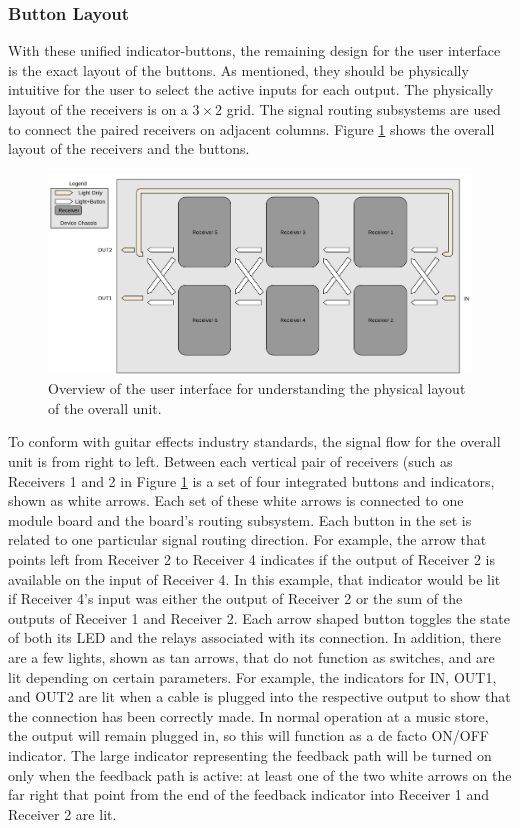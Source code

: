 \documentclass{article}
\begin{document}
	\subsubsection{Button Layout}

	With these unified indicator-buttons, the remaining design for the user interface is the exact layout of the buttons.  As mentioned, they should be physically intuitive for the user to select the active inputs for each output.  The physically layout of the receivers is on a $3 \times 2$ grid.  The signal routing subsystems are used to connect the paired receivers on adjacent columns.  Figure \ref{fig:OverallUILayout} shows the overall layout of the receivers and the buttons.

	\begin{figure}
		\centering
		\includegraphics[width = \textwidth]{PR4Images/UIOverview.png}
		\caption{Overview of the user interface for understanding the physical layout of the overall unit.}
		\label{fig:OverallUILayout}
	\end{figure}

	To conform with guitar effects industry standards, the signal flow for the overall unit is from right to left.  Between each vertical pair of receivers (such as Receivers 1 and 2 in Figure \ref{fig:OverallUILayout} is a set of four integrated buttons and indicators, shown as white arrows.  Each set of these white arrows is connected to one module board and the board's routing subsystem.  Each button in the set is related to one particular signal routing direction.  For example, the arrow that points left from Receiver 2 to Receiver 4 indicates if the output of Receiver 2 is available on the input of Receiver 4.  In this example, that indicator would be lit if Receiver 4's input was either the output of Receiver 2 or the sum of the outputs of Receiver 1 and Receiver 2.  Each arrow shaped button toggles the state of both its LED and the relays associated with its connection.  In addition, there are a few lights, shown as tan arrows, that do not function as switches, and are lit depending on certain parameters.  For example, the indicators for IN, OUT1, and OUT2 are lit when a cable is plugged into the respective output to show that the connection has been correctly made.  In normal operation at a music store, the output will remain plugged in, so this will function as a de facto ON/OFF indicator.  The large indicator representing the feedback path will be turned on only when the feedback path is active: at least one of the two white arrows on the far right that point from the end of the feedback indicator into Receiver 1 and Receiver 2 are lit.
\end{document}
